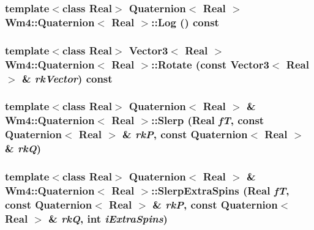 \subsubsection{\setlength{\rightskip}{0pt plus 5cm}template$<$class Real$>$ {\bf Quaternion}$<$ Real $>$ {\bf Wm4::Quaternion}$<$ Real $>$::{\bf Log} () const}\label{classWm4_1_1Quaternion_21a7fd3f85059e35d5edc10d1e8430d4}


\subsubsection{\setlength{\rightskip}{0pt plus 5cm}template$<$class Real$>$ {\bf Vector3}$<$ Real $>$ {\bf Wm4::Quaternion}$<$ Real $>$::Rotate (const {\bf Vector3}$<$ Real $>$ \& {\em rk\-Vector}) const}\label{classWm4_1_1Quaternion_f722d7183a96bea9115f77911c99bf70}


\subsubsection{\setlength{\rightskip}{0pt plus 5cm}template$<$class Real$>$ {\bf Quaternion}$<$ Real $>$ \& {\bf Wm4::Quaternion}$<$ Real $>$::Slerp (Real {\em f\-T}, const {\bf Quaternion}$<$ Real $>$ \& {\em rk\-P}, const {\bf Quaternion}$<$ Real $>$ \& {\em rk\-Q})}\label{classWm4_1_1Quaternion_0ec8407f839304a7e440ab290cf94c6c}


\subsubsection{\setlength{\rightskip}{0pt plus 5cm}template$<$class Real$>$ {\bf Quaternion}$<$ Real $>$ \& {\bf Wm4::Quaternion}$<$ Real $>$::Slerp\-Extra\-Spins (Real {\em f\-T}, const {\bf Quaternion}$<$ Real $>$ \& {\em rk\-P}, const {\bf Quaternion}$<$ Real $>$ \& {\em rk\-Q}, int {\em i\-Extra\-Spins})}\label{classWm4_1_1Quaternion_9a3d88bae1a77179140b32b03bd75fe2}


